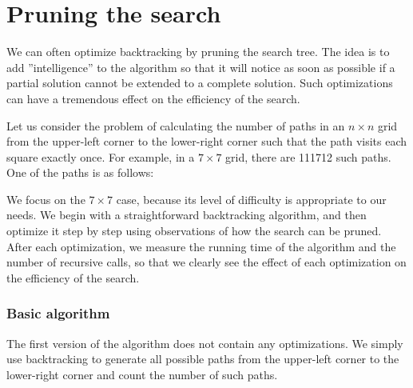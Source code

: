 \section{Pruning the search}

We can often optimize backtracking
by pruning the search tree.
The idea is to add ''intelligence'' to the algorithm
so that it will notice as soon as possible
if a partial solution cannot be extended
to a complete solution.
Such optimizations can have a tremendous
effect on the efficiency of the search.

Let us consider the problem
of calculating the number of paths
in an $n \times n$ grid from the upper-left corner
to the lower-right corner such that the
path visits each square exactly once.
For example, in a $7 \times 7$ grid,
there are 111712 such paths.
One of the paths is as follows:

\begin{center}
\end{center}

We focus on the $7 \times 7$ case,
because its level of difficulty is appropriate to our needs.
We begin with a straightforward backtracking algorithm,
and then optimize it step by step using observations
of how the search can be pruned.
After each optimization, we measure the running time
of the algorithm and the number of recursive calls,
so that we clearly see the effect of each
optimization on the efficiency of the search.

\subsubsection{Basic algorithm}

The first version of the algorithm does not contain
any optimizations. We simply use backtracking to generate
all possible paths from the upper-left corner to
the lower-right corner and count the number of such paths.

